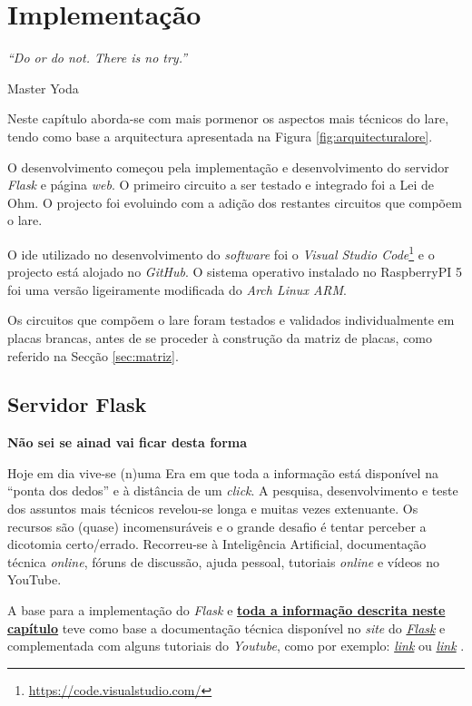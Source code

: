 \label{Capítulo4}
\chapter{Implementação}
\begin{center}
	\textit{``Do or do not. There is no try.''}

	Master Yoda
\end{center}
Neste capítulo aborda-se com mais pormenor os aspectos mais técnicos do \acrshort{lare}, tendo como base a arquitectura apresentada na Figura \ref{fig:arquitecturalore}.

O desenvolvimento começou pela implementação e desenvolvimento do servidor \textit{Flask} e página \textit{web}. O primeiro circuito a ser testado e integrado foi a Lei de Ohm. O projecto foi evoluindo com a adição dos restantes circuitos que compõem o \acrshort{lare}.

O \acrshort{ide} utilizado no desenvolvimento do \textit{software} foi o \textit{Visual Studio Code}\footnote{\url{https://code.visualstudio.com/}} e o projecto está alojado no \textit{GitHub}. O sistema operativo instalado no RaspberryPI 5 foi uma versão ligeiramente modificada do \textit{Arch Linux ARM}.

Os circuitos que compõem o \acrshort{lare} foram testados e validados individualmente em placas brancas, antes de se proceder à construção da matriz de placas, como referido na Secção \ref{sec:matriz}.

\section{Servidor Flask}
\label{sec:flask}
\textbf{Não sei se ainad vai ficar desta forma}

Hoje em dia vive-se (n)uma Era em que toda a informação está disponível na ``ponta dos dedos'' e à distância de um \textit{click}. A pesquisa, desenvolvimento e teste dos assuntos mais técnicos revelou-se longa e muitas vezes extenuante. Os recursos são (quase) incomensuráveis e o grande desafio é tentar perceber a dicotomia certo/errado. Recorreu-se à Inteligência Artificial, documentação técnica \textit{online}, fóruns de discussão, ajuda pessoal, tutoriais \textit{online} e vídeos no YouTube.

A base para a implementação do \textit{Flask} e \underline{\textbf{toda a informação descrita neste}} \underline{\textbf{capítulo}} teve como base a documentação técnica disponível no \textit{site} do \href{https://flask.palletsprojects.com/en/3.0.x/}{\textit{Flask}} e complementada com alguns tutoriais do \textit{Youtube}, como por exemplo: \href{https://www.youtube.com/watch?v=dam0GPOAvVI}{\textit{link}} ou \href{https://www.youtube.com/watch?v=bB6Yyh7nUl4}{\textit{link}} .

